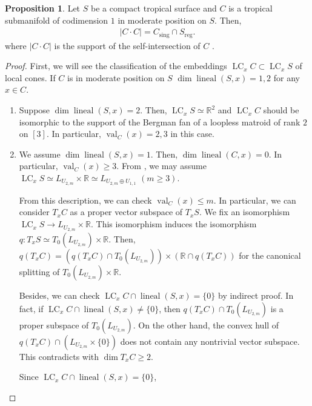 \documentclass[a4paper,dvipdfmx,reqno,12pt]{amsart}
\theoremstyle{definition}
\newtheorem{proposition}[theorem]{Proposition}
\newcommand{\opn}[1]{\operatorname{#1}}
\numberwithin{equation}{section}
\begin{document}
\begin{proposition}
\label{proposition-self-intersection}
Let $S$ be a compact tropical surface
and $C$ is a tropical submanifold of codimension $1$
in moderate position on $S$. Then, 
\begin{align}
     |C\cdot C|= C_{\mathrm{sing}}\cap S_{\mathrm{reg}}.
\end{align}
where $|C\cdot C|$ is the support of
the self-intersection of 
$C$ \cite[Definition 3.22]{shaw2015tropical}. 
\end{proposition}
\begin{proof}
First, we will see the classification of
the embeddings
$\opn{LC}_x C \subset \opn{LC}_x S$ of local cones.
If $C$ is in moderate position on $S$
$\dim \opn{lineal}(S,x)=1,2$ for any $x\in C$.
\begin{enumerate}[align=left,leftmargin=*]
\item Suppose $\dim \opn{lineal}(S,x)=2$.
Then, $\opn{LC}_x S\simeq \mathbb{R}^2$ and
$\opn{LC}_x C$ should be isomorphic to 
the support of the Bergman fan of a loopless matroid
of rank $2$ on $[3]$. 
In particular, $\opn{val}_C(x)=2,3$ in this case.
\item We assume $\dim \opn{lineal}(S,x)=1$. 
Then, $\dim \opn{lineal}(C,x)=0$.
In particular, $\opn{val}_C(x)\geq 3$.
From \cite[Corollary 2.4]{shaw2015tropical}, 
we may assume $\opn{LC}_x S\simeq L_{U_{2,m}}\times \mathbb{R}
\simeq L_{U_{2,m}\oplus U_{1,1}}$
$(m\geq 3)$.

From this description, we can check $\opn{val}_C(x)\leq m$.
In particular, we can consider $T_x C$ as 
a proper vector subspace of $T_x S$.
We fix an isomorphism 
$\opn{LC}_x S\to L_{U_{2,m}}\times \mathbb{R}$.
This isomorphism induces the isomorphism
$q\colon T_x S \simeq T_0(L_{U_{2,m}})\times \mathbb{R}$.
Then, $q(T_x C)= (q(T_x C)\cap T_0(L_{U_{2,m}}))\times
(\mathbb{R}\cap q(T_x C))$ for the canonical splitting of
$T_0(L_{U_{2,m}})\times \mathbb{R}$.

Besides, we can check 
$\opn{LC}_x C\cap \opn{lineal}(S,x)=\{0\}$
by indirect proof.
In fact, if $\opn{LC}_x C\cap \opn{lineal}(S,x)\ne \{0\}$,
then $q(T_x C)\cap T_0(L_{U_{2,m}})$ is a
proper subspace of $T_0(L_{U_{2,m}})$.
On the other hand,
the convex hull of $q(T_x C)\cap (L_{U_{2,m}}\times\{0\})$
does not contain any nontrivial vector subspace.
This contradicts with $\dim T_x C\geq 2$.

Since $\opn{LC}_x C\cap \opn{lineal}(S,x)=\{0\}$,
\end{enumerate}


\end{proof}
\end{document}
